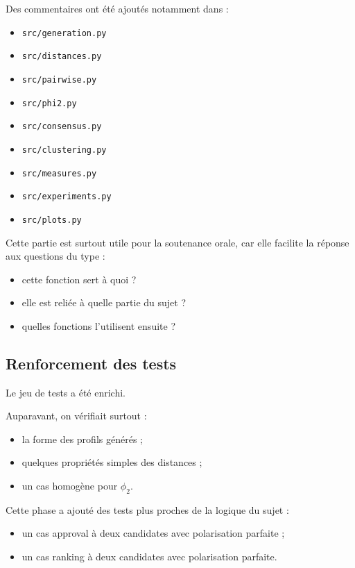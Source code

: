 \documentclass[11pt,a4paper]{article}
\begin{document}
Des commentaires ont \'et\'e ajout\'es notamment dans :
\begin{itemize}[leftmargin=*]
    \item \texttt{src/generation.py}
    \item \texttt{src/distances.py}
    \item \texttt{src/pairwise.py}
    \item \texttt{src/phi2.py}
    \item \texttt{src/consensus.py}
    \item \texttt{src/clustering.py}
    \item \texttt{src/measures.py}
    \item \texttt{src/experiments.py}
    \item \texttt{src/plots.py}
\end{itemize}

Cette partie est surtout utile pour la soutenance orale, car elle facilite la r\'eponse aux questions du type :
\begin{itemize}[leftmargin=*]
    \item \og cette fonction sert \`a quoi ? \fg
    \item \og elle est reli\'ee \`a quelle partie du sujet ? \fg
    \item \og quelles fonctions l'utilisent ensuite ? \fg
\end{itemize}

\subsection{Renforcement des tests}

Le jeu de tests a \'et\'e enrichi.

Auparavant, on v\'erifiait surtout :
\begin{itemize}[leftmargin=*]
    \item la forme des profils g\'en\'er\'es ;
    \item quelques propri\'et\'es simples des distances ;
    \item un cas homog\`ene pour \(\phi_2\).
\end{itemize}

Cette phase a ajout\'e des tests plus proches de la logique du sujet :
\begin{itemize}[leftmargin=*]
    \item un cas approval \`a deux candidates avec polarisation parfaite ;
    \item un cas ranking \`a deux candidates avec polarisation parfaite.
\end{itemize}
\end{document}
